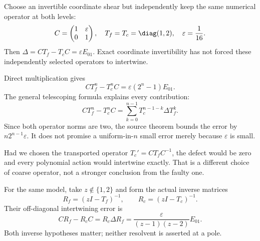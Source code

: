 
Choose an invertible coordinate shear but independently keep the same numerical operator at both levels:
\[
C=\begin{pmatrix}1&\varepsilon\\0&1\end{pmatrix},\quad
T_f=T_c=\diag(1,2),\quad \varepsilon=\frac1{16}.
\]
Then $\Delta=CT_f-T_cC=\varepsilon E_{01}$. Exact coordinate invertibility has not forced these independently selected operators to intertwine.


Direct multiplication gives
\[
CT_f^n-T_c^nC=\varepsilon(2^n-1)E_{01}.
\]
The general telescoping formula explains every contribution:
\[
CT_f^n-T_c^nC
=\sum_{k=0}^{n-1}T_c^{n-1-k}\Delta T_f^k.
\]
Since both operator norms are two, the source theorem bounds the error by $n2^{n-1}\varepsilon$. It does not promise a uniform-in-$n$ small error merely because $\varepsilon$ is small.

Had we chosen the transported operator $T_c'=CT_fC^{-1}$, the defect would be zero and every polynomial action would intertwine exactly. That is a different choice of coarse operator, not a stronger conclusion from the faulty one.


For the same model, take $z\notin\{1,2\}$ and form the actual inverse matrices
\[
R_f=(zI-T_f)^{-1},\qquad R_c=(zI-T_c)^{-1}.
\]
Their off-diagonal intertwining error is
\[
CR_f-R_cC=R_c\Delta R_f
=\frac{\varepsilon}{(z-1)(z-2)}E_{01}.
\]
Both inverse hypotheses matter; neither resolvent is asserted at a pole.

